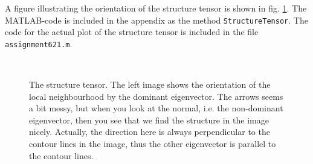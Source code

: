 \documentclass[a4paper, 10pt, final]{article}
\begin{document}
A figure illustrating the orientation of the structure tensor is shown
in fig. \ref{structure_tensors}. The MATLAB-code is included in the
appendix as the method \texttt{StructureTensor}. The code for the actual
plot of the structure tensor is included in the file
\texttt{assignment621.m}.

\begin{figure}[!h]
    \centering
    \hspace{1em}
    \\
    \caption[]{The structure tensor. The left image shows the
    orientation of the local neighbourhood by the dominant eigenvector.
    The arrows seems a bit messy, but when you look at the normal, i.e.
    the non-dominant eigenvector, then you see that we find the structure
    in the image nicely. Actually, the direction here is always
    perpendicular to the contour lines in the image, thus the other
    eigenvector is parallel to the contour lines.}
    \label{structure_tensors}
\end{figure}
\end{document}
